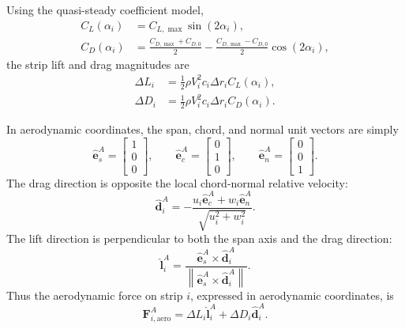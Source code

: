 \documentclass{article}
\begin{document}
Using the quasi-steady coefficient model,
\begin{align}
    C_L(\alpha_i)
        &= C_{L,\max}\sin(2\alpha_i), \\
    C_D(\alpha_i)
        &=
        \frac{C_{D,\max}+C_{D,0}}{2}
        -
        \frac{C_{D,\max}-C_{D,0}}{2}
        \cos(2\alpha_i),
\end{align}
the strip lift and drag magnitudes are
\begin{align}
    \Delta L_i
        &=
        \frac{1}{2}\rho V_i^2 c_i\Delta r_i C_L(\alpha_i), \\
    \Delta D_i
        &=
        \frac{1}{2}\rho V_i^2 c_i\Delta r_i C_D(\alpha_i).
\end{align}

In aerodynamic coordinates, the span, chord, and normal unit vectors are simply
\[
    \hat{\mathbf{e}}_s^A =
    \begin{bmatrix}
        1\\0\\0
    \end{bmatrix},
    \qquad
    \hat{\mathbf{e}}_c^A =
    \begin{bmatrix}
        0\\1\\0
    \end{bmatrix},
    \qquad
    \hat{\mathbf{e}}_n^A =
    \begin{bmatrix}
        0\\0\\1
    \end{bmatrix}.
\]
The drag direction is opposite the local chord-normal relative velocity:
\begin{equation}
    \hat{\mathbf{d}}_i^A
    =
    -
    \frac{
        u_i\hat{\mathbf{e}}_c^A
        +
        w_i\hat{\mathbf{e}}_n^A
    }{
        \sqrt{u_i^2+w_i^2}
    }.
\end{equation}
The lift direction is perpendicular to both the span axis and the drag direction:
\begin{equation}
    \hat{\mathbf{l}}_i^A
    =
    \frac{
        \hat{\mathbf{e}}_s^A
        \times
        \hat{\mathbf{d}}_i^A
    }{
        \left\|
            \hat{\mathbf{e}}_s^A
            \times
            \hat{\mathbf{d}}_i^A
        \right\|
    }.
\end{equation}
Thus the aerodynamic force on strip \(i\), expressed in aerodynamic coordinates, is
\begin{equation}
    \mathbf{F}_{i,\mathrm{aero}}^{A}
    =
    \Delta L_i\hat{\mathbf{l}}_i^A
    +
    \Delta D_i\hat{\mathbf{d}}_i^A.
\end{equation}
\end{document}
